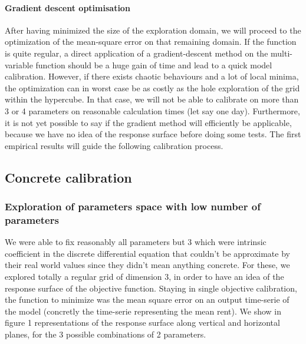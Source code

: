 \documentclass[english]{article}
\begin{document}
\paragraph*{Gradient descent optimisation}

After having minimized the size of the exploration domain, we will
proceed to the optimization of the mean-square error on that remaining
domain. If the function is quite regular, a direct application of
a gradient-descent method on the multi-variable function should be
a huge gain of time and lead to a quick model calibration. However,
if there exists chaotic behaviours and a lot of local minima, the
optimization can in worst case be as costly as the hole exploration
of the grid within the hypercube. In that case, we will not be able
to calibrate on more than 3 or 4 parameters on reasonable calculation
times (let say one day). Furthermore, it is not yet possible to say
if the gradient method will efficiently be applicable, because we
have no idea of the response surface before doing some tests. The
first empirical results will guide the following calibration process.


\subsection*{Concrete calibration}


\subsubsection*{Exploration of parameters space with low number of parameters}

We were able to fix reasonably all parameters but 3 which were intrinsic
coefficient in the discrete differential equation that couldn't be
approximate by their real world values since they didn't mean anything
concrete. For these, we explored totally a regular grid of dimension
3, in order to have an idea of the response surface of the objective
function. Staying in single objective calibration, the function to
minimize was the mean square error on an output time-serie of the
model (concretly the time-serie representing the mean rent). We show
in figure 1 representations of the response surface along vertical
and horizontal planes, for the 3 possible combinations of 2 parameters.
\end{document}
